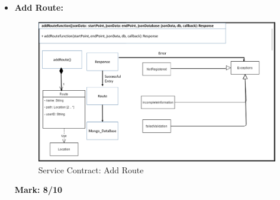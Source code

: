 \begin{itemize}
\newpage	
\item \textbf{Add Route:}\\
\begin{figure}[H]
\includegraphics[scale=0.5]{service_contracts/addRoute.png}
\caption{Service Contract: Add Route}
\end{figure}
	\textbf{Mark: 8/10}
\end{itemize}